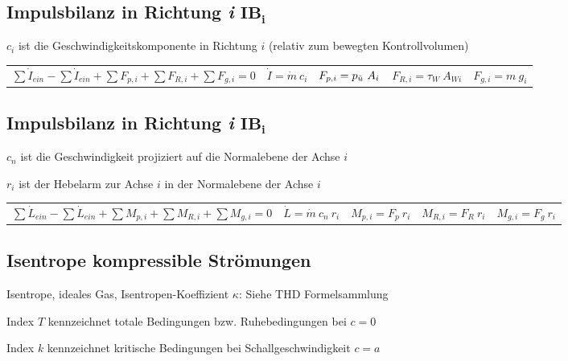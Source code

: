 \subsection{Impulsbilanz in Richtung \textit{i} $\mathbf{IB_i}$ }
	$ c_i $ ist die Geschwindigkeitskomponente in Richtung $ i $ (relativ zum bewegten Kontrollvolumen)
%	
	\begin{center}
		\setlength{\tabcolsep}{0.65em} %
		\begin{tabular}{lllll}
			  $ \sum \dot{I}_{ein} - \sum \dot{I}_{ein} + \sum F_{p,i} + \sum F_{R,i} + \sum F_{g,i} = 0$
			& $ \dot{I} = \dot{m} \ c_i $
			& $ F_{p,i} = p_{\ddot{u}} \ A_i $
			& $ F_{R,i} = \tau_W \ A_{Wi} $
			& $ F_{g,i} = m \ g_i $
		\end{tabular}
	\end{center}

\subsection{Impulsbilanz in Richtung \textit{i} $\mathbf{IB_i}$ }
	$ c_n $ ist die Geschwindigkeit projiziert auf die Normalebene der Achse $ i $
	
	$ r_i $ ist der Hebelarm zur Achse $ i $ in der Normalebene der Achse $ i $
%	
	\begin{center}
		\setlength{\tabcolsep}{0.4em} %
		\begin{tabular}{lllll}
			$ \sum \dot{L}_{ein} - \sum \dot{L}_{ein} + \sum M_{p,i} + \sum M_{R,i} + \sum M_{g,i} = 0$
			& $ \dot{L} = \dot{m} \ c_n \ r_i $
			& $ M_{p,i} = F_p\ r_i $
			& $ M_{R,i} = F_R\ r_i $
			& $ M_{g,i} = F_g\ r_i $
		\end{tabular}
	\end{center}

\subsection{Isentrope kompressible Strömungen}
	Isentrope, ideales Gas, Isentropen-Koeffizient $\kappa$: Siehe THD Formelsammlung
	
	Index $ T $ kennzeichnet totale Bedingungen bzw. Ruhebedingungen bei $ c = 0 $
	
	Index $ k $ kennzeichnet kritische Bedingungen bei Schallgeschwindigkeit $ c = a $
	
